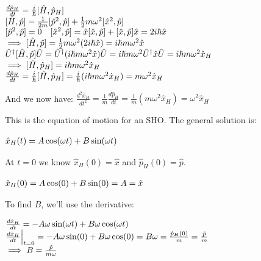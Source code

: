 \documentclass[14pt]{extarticle}
\makeatletter
\newenvironment{lefteqs}{%
    \begin{flushleft}%
    \renewcommand{\arraystretch}{1.3}%
    $\begin{array}{@{}l@{}}%
}{%
    \end{array}$%
    \end{flushleft}%
}
\makeatother
\begin{document}
\begin{lefteqs}
    \frac{d \hat{p}_H}{dt} = \frac{i}{\hbar} [\hat{H}, \hat{p}_H] \\
    {}[\hat{H}, \hat{p}] = \frac{1}{2m} [\hat{p}^2, \hat{p}] + \frac{1}{2} m \omega^2 [\hat{x}^2, \hat{p}] \\
    {}[\hat{p}^2, \hat{p}] = 0 \quad [\hat{x}^2, \hat{p}] = \hat{x} [\hat{x}, \hat{p}] + [\hat{x}, \hat{p}] \hat{x} = 2 i \hbar \hat{x} \\
    \implies [\hat{H}, \hat{p}] = \frac{1}{2} m \omega^2 (2 i \hbar \hat{x}) = i \hbar m \omega^2 \hat{x} \\
    \hat{U}^\dagger [\hat{H}, \hat{p}] \hat{U} = \hat{U}^\dagger (i \hbar m \omega^2 \hat{x}) \hat{U} = i \hbar m \omega^2 \hat{U}^\dagger \hat{x} \hat{U} = i \hbar m \omega^2 \hat{x}_H \\
    \implies [\hat{H}, \hat{p}_H] = i \hbar m \omega^2 \hat{x}_H \\
    \frac{d \hat{p}_H}{dt} = \frac{i}{\hbar} [\hat{H}, \hat{p}_H] = \frac{i}{\hbar} (i \hbar m \omega^2 \hat{x}_H) = m \omega^2 \hat{x}_H
\end{lefteqs}

And we now have: $\frac{d^2 \hat{x}_H}{dt^2} = \frac{1}{m} \frac{d \hat{p}_H}{dt} = \frac{1}{m} (m \omega^2 \hat{x}_H) = \omega^2 \hat{x}_H$

This is the equation of motion for an SHO.
The general solution is:
\begin{lefteqs}
    \hat{x}_H(t) = A \cos(\omega t) + B \sin(\omega t)
\end{lefteqs}

At $t=0$ we know $\hat{x}_H(0) = \hat{x}$ and $\hat{p}_H(0) = \hat{p}$.

\begin{lefteqs}
    \hat{x}_H(0) = A \cos(0) + B \sin(0) = A = \hat{x} \\
\end{lefteqs}

To find $B$, we'll use the derivative:

\begin{lefteqs}
    \frac{d \hat{x}_H}{dt} = -A \omega \sin(\omega t) + B \omega \cos(\omega t) \\
    \frac{d \hat{x}_H}{dt} \Big|_{t=0} = -A \omega \sin(0) + B \omega \cos(0) = B \omega = \frac{\hat{p}_H(0)}{m} = \frac{\hat{p}}{m} \\
    \implies B = \frac{\hat{p}}{m \omega}
\end{lefteqs}
\end{document}
